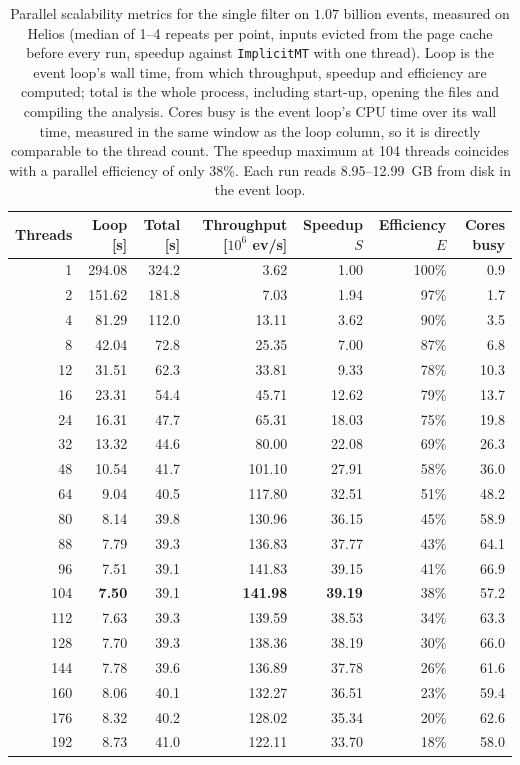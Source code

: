 \begin{table}[htbp]
\centering
\caption{Parallel scalability metrics for the single filter on $1.07$ billion events, measured on Helios (median of 1--4 repeats per point, inputs evicted from the page cache before every run, speedup against \texttt{ImplicitMT} with one thread). Loop is the event loop's wall time, from which throughput, speedup and efficiency are computed; total is the whole process, including start-up, opening the files and compiling the analysis. Cores busy is the event loop's CPU time over its wall time, measured in the same window as the loop column, so it is directly comparable to the thread count. The speedup maximum at 104 threads coincides with a parallel efficiency of only $38\%$. Each run reads 8.95--12.99~GB from disk in the event loop.}
\label{tab:scalability-filter}
\setlength{\tabcolsep}{5pt}
\begin{tabular}{rrrrrrr}
\toprule
Threads & Loop [s] & Total [s] & Throughput [$10^6$ ev/s] & Speedup $S$ & Efficiency $E$ & Cores busy \\
\midrule
 1 & 294.08 & 324.2 & 3.62 & 1.00 & 100\% & 0.9 \\
 2 & 151.62 & 181.8 & 7.03 & 1.94 & 97\% & 1.7 \\
 4 & 81.29 & 112.0 & 13.11 & 3.62 & 90\% & 3.5 \\
 8 & 42.04 & 72.8 & 25.35 & 7.00 & 87\% & 6.8 \\
12 & 31.51 & 62.3 & 33.81 & 9.33 & 78\% & 10.3 \\
16 & 23.31 & 54.4 & 45.71 & 12.62 & 79\% & 13.7 \\
24 & 16.31 & 47.7 & 65.31 & 18.03 & 75\% & 19.8 \\
32 & 13.32 & 44.6 & 80.00 & 22.08 & 69\% & 26.3 \\
48 & 10.54 & 41.7 & 101.10 & 27.91 & 58\% & 36.0 \\
64 & 9.04 & 40.5 & 117.80 & 32.51 & 51\% & 48.2 \\
80 & 8.14 & 39.8 & 130.96 & 36.15 & 45\% & 58.9 \\
88 & 7.79 & 39.3 & 136.83 & 37.77 & 43\% & 64.1 \\
96 & 7.51 & 39.1 & 141.83 & 39.15 & 41\% & 66.9 \\
104 & \textbf{7.50} & 39.1 & \textbf{141.98} & \textbf{39.19} & 38\% & 57.2 \\
112 & 7.63 & 39.3 & 139.59 & 38.53 & 34\% & 63.3 \\
128 & 7.70 & 39.3 & 138.36 & 38.19 & 30\% & 66.0 \\
144 & 7.78 & 39.6 & 136.89 & 37.78 & 26\% & 61.6 \\
160 & 8.06 & 40.1 & 132.27 & 36.51 & 23\% & 59.4 \\
176 & 8.32 & 40.2 & 128.02 & 35.34 & 20\% & 62.6 \\
192 & 8.73 & 41.0 & 122.11 & 33.70 & 18\% & 58.0 \\
\bottomrule
\end{tabular}
\end{table}
